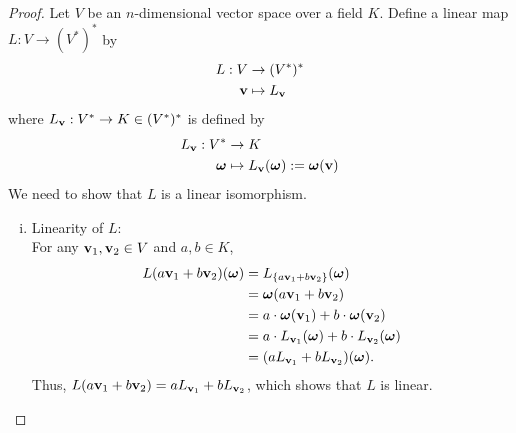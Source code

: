 \begin{proof}
    Let \(V\) be an \(n\)-dimensional vector space over a field \(K\). Define a linear map \(L: V \to (V^*)^*\) by
    \begin{equation}
        \begin{aligned}
            L: V   & \to (V^*)^*        \\
            \vb{v} & \mapsto L_{\vb{v}}
        \end{aligned}
    \end{equation}
    where \(L_{\vb{v}}: V^* \to K \in (V^*)^*\) is defined by
    \begin{equation}
        \begin{aligned}
            L_{\vb{v}}: V^* & \to K                                                    \\
            \vb*{\omega}    & \mapsto L_{\vb{v}}(\vb*{\omega}) := \vb*{\omega}(\vb{v})
        \end{aligned}
    \end{equation}
    We need to show that \(L\) is a linear isomorphism.
    \begin{enumerate}[(i)]
        \item \textsf{Linearity of \(L\)}:\\
              For any \(\vb{v}_1, \vb{v}_2 \in V\) and \(a, b \in K\),
              \begin{align*}
                  L(a \vb{v}_1 + b \vb{v}_2)(\vb*{\omega}) & = L_{\qty{a \vb{v}_1 + b \vb{v}_2}}(\vb*{\omega})                         \\
                                                           & = \vb*{\omega}(a \vb{v}_1 + b \vb{v}_2)                                   \\
                                                           & = a \cdot \vb*{\omega}(\vb{v}_1) + b \cdot \vb*{\omega}(\vb{v}_2)         \\
                                                           & = a \cdot L_{\vb{v}_1}(\vb*{\omega}) + b \cdot L_{\vb{v}_2}(\vb*{\omega}) \\
                                                           & = (a L_{\vb{v}_1} + b L_{\vb{v}_2})(\vb*{\omega}).
              \end{align*}
              Thus, \(L(a \vb{v}_1 + b \vb{v}_2) = a L_{\vb{v}_1} + b L_{\vb{v}_2}\), which shows that \(L\) is linear.



\end{enumerate}
\end{proof}
